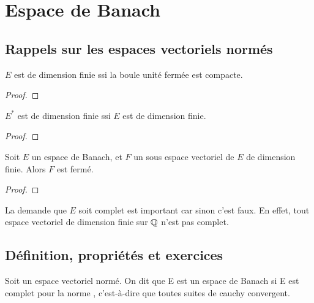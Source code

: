 \chapter{Espace de Banach}

\section{Rappels sur les espaces vectoriels normés}

\begin{theorem} [Riesz]
\label{theorem_riesz_compact}
	$E$ est de dimension finie ssi la boule unité fermée est compacte.
\end{theorem}

\begin{proof}

\end{proof}

\begin{proposition}
\label{proposition_dual_dimension}
	$E^{*}$ est de dimension finie ssi $E$ est de dimension finie.
\end{proposition}

\begin{proof}
	
\end{proof}

\begin{theorem}
\label{theorem_closed_vectorial_subspace}
	Soit $E$ un espace de Banach, et $F$ un sous espace vectoriel de $E$ de
	dimension finie.
	Alors $F$ est fermé.
\end{theorem}

\begin{proof}
	
\end{proof}

\begin{remarque}
	La demande que $E$ soit complet est important car sinon c'est faux. En
	effet, tout espace vectoriel de dimension finie sur $\mathbb{Q}$ n'est pas
	complet.
\end{remarque}

\section{Définition, propriétés et exercices}

\begin{definition} 
	Soit  un espace vectoriel normé. On dit que E
	est un espace de Banach si E est complet pour la norme ,
	c'est-à-dire que toutes suites de cauchy convergent.
\end{definition}

